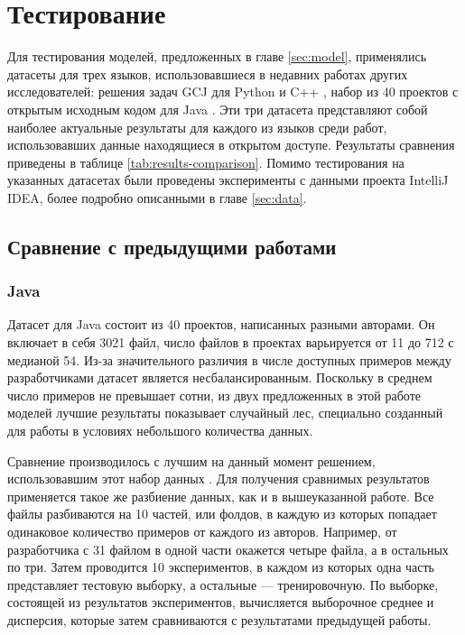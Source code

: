 \section{Тестирование}\label{sec:evaluation}
Для тестирования моделей, предложенных в главе \ref{sec:model}, применялись датасеты для трех языков, использовавшиеся в недавних работах других исследователей: решения задач GCJ для Python \cite{Alsulami2017} и C++ \cite{Caliskan2015}, набор из 40 проектов с открытым исходным кодом для Java \cite{Yang2017}. Эти три датасета представляют собой наиболее актуальные результаты для каждого из языков среди работ, использовавших данные находящиеся в открытом доступе. Результаты сравнения приведены в таблице \ref{tab:results-comparison}. Помимо тестирования на указанных датасетах были проведены эксперименты с данными проекта IntelliJ IDEA, более подробно описанными в главе \ref{sec:data}.

\subsection{Сравнение с предыдущими работами}

\subsubsection{Java}
Датасет для Java состоит из 40 проектов, написанных разными авторами. Он включает в себя 3021 файл, число файлов в проектах варьируется от 11 до 712 с медианой 54. Из-за значительного различия в числе доступных примеров между разработчиками датасет является несбалансированным. Поскольку в среднем число примеров не превышает сотни, из двух предложенных в этой работе моделей лучшие результаты показывает случайный лес, специально созданный для работы в условиях небольшого количества данных.

Сравнение производилось с лучшим на данный момент решением, использовавшим этот набор данных \cite{Yang2017}. Для получения сравнимых результатов применяется такое же разбиение данных, как и в вышеуказанной работе. Все файлы разбиваются на 10 частей, или фолдов, в каждую из которых попадает одинаковое количество примеров от каждого из авторов. Например, от разработчика с 31 файлом в одной части окажется четыре файла, а в остальных по три. Затем проводится 10 экспериментов, в каждом из которых одна часть представляет тестовую выборку, а остальные — тренировочную. По выборке, состоящей из результатов экспериментов, вычисляется выборочное среднее и дисперсия, которые затем сравниваются с результатами предыдущей работы.

